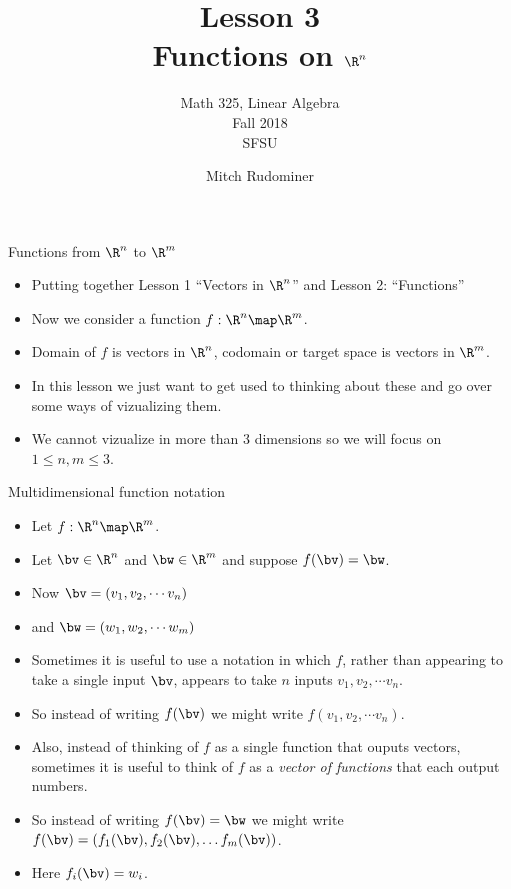 \documentclass{beamer}
\title{Lesson 3 \\ Functions on $\R^n$}
\subtitle{Math 325, Linear Algebra \\ Fall 2018 \\ SFSU}
\author{Mitch Rudominer}
\date{}
\begin{document}
\begin{frame}
  \titlepage
\end{frame}


\beamerdefaultoverlayspecification{<+->}

\begin{frame}{Functions from $\R^n$ to $\R^m$}

\begin{itemize}
\item Putting together Lesson 1 ``Vectors in $\R^n$'' and Lesson 2: ``Functions''
\item Now we consider a function $f:\R^n \map \R^m$.
\item Domain of $f$ is vectors in $\R^n$, codomain or target space is vectors
in $\R^m$.
\item In this lesson we just want to get used to thinking about these and
go over some ways of vizualizing them.
\item We cannot vizualize in more than 3 dimensions so we will focus on
$1\leq n, m \leq 3$.
\end{itemize}

\end{frame}

\begin{frame}{Multidimensional function notation}

\begin{itemize}
\item Let $f:\R^n \map \R^m$.
\item Let $\bv \in \R^n$ and $\bw \in \R^m$ and suppose $f(\bv) = \bw$.
\item Now $\bv = (v_1, v_2, \cdots v_n)$
\item and $\bw = (w_1, w_2, \cdots w_m)$
\item Sometimes it is useful to use a notation in which $f$, rather than appearing
to take a single input $\bv$, appears to take $n$ inputs $v_1, v_2, \cdots v_n$.
\item So instead of writing $f(\bv)$ we might write $f(v_1, v_2, \cdots v_n)$.
\item Also, instead of thinking of $f$ as a single function that
ouputs vectors, sometimes it is useful to think of $f$ as a
\emph{vector of functions} that each output numbers.
\item So instead of writing $f(\bv) = \bw$ we might write
$f(\bv) = (f_1(\bv), f_2(\bv), \dots f_m(\bv))$.
\item Here $f_i(\bv) = w_i$.
\end{itemize}

\end{frame}
\end{document}
